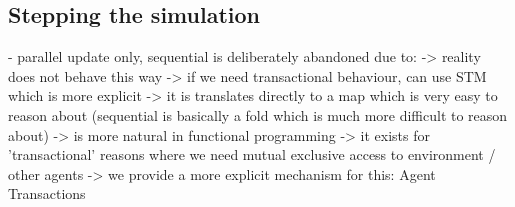\subsection{Stepping the simulation}

- parallel update only, sequential is deliberately abandoned due to:
		-> reality does not behave this way
		-> if we need transactional behaviour, can use STM which is more explicit
		-> it is translates directly to a map which is very easy to reason about (sequential is basically a fold which is much more difficult to reason about)
		-> is more natural in functional programming
		-> it exists for 'transactional' reasons where we need mutual exclusive access to environment / other agents
			-> we provide a more explicit mechanism for this: Agent Transactions
			